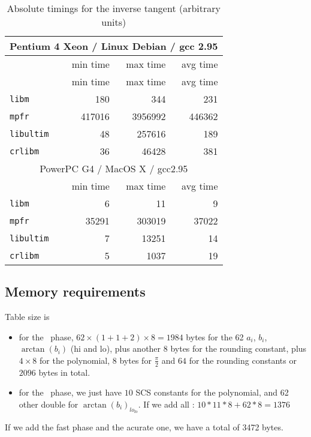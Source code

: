 \begin{table}[!htb]
\begin{center}
\renewcommand{\arraystretch}{1.2}
\begin{tabular}{|l|r|r|r|}
\hline
\hline

 \multicolumn{4}{|c|}{Pentium 4 Xeon / Linux Debian / gcc 2.95}   \\
 \hline
                         & min time      & max time      & avg time \\ 
 \hline
                         & min time      & max time      & avg time \\ 
 \hline
 \texttt{libm}           & 180          & 344           &        231 \\ 
 \hline
  \texttt{mpfr}          & 417016       & 3956992       &     446362 \\ 
 \hline
  \texttt{libultim}      & 48           & 257616        &        189 \\ 
 \hline
 \texttt{crlibm}         & 36           & 46428         &        381 \\ 
 \hline
 \hline
  \multicolumn{4}{|c|}{PowerPC G4 / MacOS X / gcc2.95}   \\
 \hline
                         & min time      & max time      & avg time \\
 \hline
 \texttt{libm}           & 6            & 11            &          9 \\
 \hline
  \texttt{mpfr}          & 35291        & 303019        &      37022 \\
 \hline
  \texttt{libultim}      & 7            & 13251         &         14 \\
 \hline
 \texttt{crlibm}         & 5            & 1037          &         19 \\
 \hline
 \hline

\end{tabular}
\end{center}
\caption{Absolute timings for the inverse tangent (arbitrary units)
  \label{tbl:arctan_abstime}}
\end{table}

\subsection{Memory requirements}
Table size is
\begin{itemize}
\item for the \quick\ phase,
  $62\times (1+1+2) \times8=1984$ bytes for the 62 $a_i$, $b_i$,
  $\arctan(b_i)$ (hi and lo), plus another $8$ bytes for the rounding
  constant, plus $4\times8$ for the polynomial, $8$ bytes for
  $\frac{\pi}{2}$ and $64$ for the rounding constants or $2096$ bytes in
  total.
  
\item for the \accurate\ phase, we just have $10$ SCS constants for the
  polynomial, and 62 other double for $\arctan(b_i)_{lo_{lo}}$.
  If we add all : $10*11*8 + 62*8 = 1376$
\end{itemize}
If we add the fast phase and the acurate one, we have a total of 3472
bytes. 



